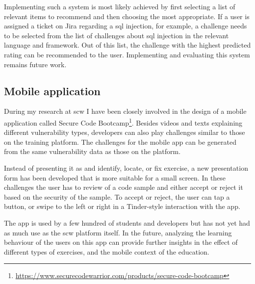 Implementing such a system is most likely achieved by first selecting a list of relevant items to recommend and then choosing the most appropriate.
If a user is assigned a ticket on Jira regarding a \gls{sql} injection, for example, a challenge needs to be selected from the list of challenges about \gls{sql} injection in the relevant language and framework.
Out of this list, the challenge with the highest predicted rating can be recommended to the user.
Implementing and evaluating this system remains future work.

\subsection{Mobile application}
During my research at \gls{scw} I have been closely involved in the design of a mobile application called Secure Code Bootcamp\footnote{\url{https://www.securecodewarrior.com/products/secure-code-bootcamp}}.
Besides videos and texts explaining different vulnerability types, developers can also play challenges similar to those on the training platform.
The challenges for the mobile app can be generated from the same vulnerability data as those on the platform.

Instead of presenting it as and identify, locate, or fix exercise, a new presentation form has been developed that is more suitable for a small screen.
In these challenges the user has to review of a code sample and either accept or reject it based on the security of the sample.
To accept or reject, the user can tap a button, or swipe to the left or right in a Tinder-style interaction with the app. 

The app is used by a few hundred of students and developers but has not yet had as much use as the \gls{scw} platform itself.
In the future, analyzing the learning behaviour of the users on this app can provide further insights in the effect of different types of exercises, and the mobile context of the education.